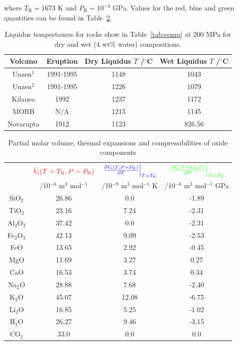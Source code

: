 \documentclass[]{book}
\theoremstyle{definition}
\begin{document}
\begin{enumerate}
  where $T_{\text{R}} = 1673$ K and $P_{\text{R}} = 10^{-4}$ GPa. Values for the red, blue and green quantities can be found in Table~\ref{tab:mol_vol}.
  
  \begin{table}
    \centering
    \caption{Liquidus tempertaures for rocks show in Table~\ref{tab:comp} at 200 MPa for dry and wet (4 wt\% water) compositions. \label{tab:liq}}
    \begin{tabular}{|c|c|c|c|}
      \hline
      Volcano & Eruption & Dry Liquidus $T$ /$^{\circ}$C & Wet Liquidus $T$ /$^{\circ}$C  \\
      \hline
      Unzen$^{1}$ & 1991-1995 & 1148 & 1043 \\
      Unzen$^{2}$ & 1991-1995 & 1226 & 1079 \\
      Kilauea & 1992 & 1237 & 1172 \\
      MORB & N/A & 1215 & 1145 \\
      Novarupta & 1912 & 1123 & 826.56 \\
      \hline
    \end{tabular}
  \end{table}

  \begin{table}
    \centering
    \caption{Partial molar volume, thermal expansions and compressibilities of oxide components \label{tab:mol_vol}}
    \begin{tabular}{|c|c|c|c|}
      \hline
      & $\textcolor{red}{\bar{V_{i}}(T = T_{\text{R}}, P = P_{\text{R}})}$ & $\textcolor{blue}{\left.\frac{\partial \bar{V_{i}}(T, P = P_{\text{R}})}{\partial T}\right|_{T = T_{\text{R}}}}$ & $\textcolor{green}{\left.\frac{\partial \bar{V_{i}}(T = T_{\text{R}}, P)}{\partial P}\right|_{P = P_{R}}}$ \\
      & /10$^{-6}$ m$^{3}$ mol$^{-1}$ & /10$^{-9}$ m$^{3}$ mol$^{-1}$ K & /10$^{-6}$ m$^{3}$ mol$^{-1}$ GPa \\
      \hline
      SiO$_{2}$ & 26.86 & 0.0 & -1.89 \\
      TiO$_{2}$ & 23.16 & 7.24 & -2.31 \\
      Al$_{2}$O$_{3}$ & 37.42 & 0.0 & -2.31 \\
      Fe$_{2}$O$_{3}$ & 42.13 & 9.09 & -2.53 \\
      FeO & 13.65 & 2.92 & -0.45 \\
      MgO & 11.69 & 3.27 & 0.27 \\
      CaO & 16.53 & 3.74 & 0.34 \\
      Na$_{2}$O & 28.88 & 7.68 & -2.40 \\
      K$_{2}$O & 45.07 & 12.08 & -6.75 \\
      Li$_{2}$O & 16.85 & 5.25 & -1.02 \\
      H$_{2}$O & 26.27 & 9.46 & -3.15 \\
      CO$_{2}$ & 33.0 & 0.0 & 0.0 \\
      \hline  
    \end{tabular}
  \end{table}


\end{enumerate}
\end{document}
